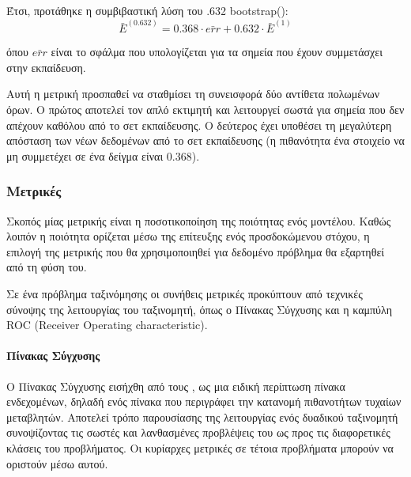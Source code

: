 Έτσι, προτάθηκε η συμβιβαστική λύση του .632 bootstrap():
\begin{equation}
\bar{E}^{(0.632)}= 0.368 \cdot \bar{err} + 0.632 \cdot \bar{E}^{(1)}
\end{equation}

όπου $\bar{err}$ είναι το σφάλμα που υπολογίζεται για τα σημεία που έχουν συμμετάσχει στην εκπαίδευση.

Αυτή η μετρική προσπαθεί να σταθμίσει τη συνεισφορά δύο αντίθετα πολωμένων όρων. Ο πρώτος αποτελεί τον απλό εκτιμητή και λειτουργεί σωστά για σημεία που δεν απέχουν καθόλου από το σετ εκπαίδευσης. Ο δεύτερος έχει υποθέσει τη μεγαλύτερη απόσταση των νέων δεδομένων από το σετ εκπαίδευσης (η πιθανότητα ένα στοιχείο να μη συμμετέχει σε ένα δείγμα είναι $0.368$).
\subsubsection{Μετρικές} Σκοπός μίας μετρικής είναι η ποσοτικοποίηση της ποιότητας ενός μοντέλου. Καθώς λοιπόν η ποιότητα ορίζεται μέσω της επίτευξης ενός προσδοκώμενου στόχου, η επιλογή της μετρικής που θα χρησιμοποιηθεί για δεδομένο πρόβλημα θα εξαρτηθεί από τη φύση του.

Σε ένα πρόβλημα ταξινόμησης οι συνήθεις μετρικές προκύπτουν από τεχνικές σύνοψης της λειτουργίας του ταξινομητή, όπως ο Πίνακας Σύγχυσης και η καμπύλη ROC (Receiver Operating characteristic).

\paragraph{Πίνακας Σύγχυσης} Ο Πίνακας Σύγχυσης εισήχθη από τους \citet{Provost98onapplied}, ως μια ειδική περίπτωση πίνακα ενδεχομένων, δηλαδή ενός πίνακα που περιγράφει την κατανομή πιθανοτήτων τυχαίων μεταβλητών. Αποτελεί τρόπο παρουσίασης της λειτουργίας ενός δυαδικού ταξινομητή συνοψίζοντας τις σωστές και λανθασμένες προβλέψεις του ως προς τις διαφορετικές κλάσεις του προβλήματος. Οι κυρίαρχες μετρικές σε τέτοια προβλήματα μπορούν να οριστούν μέσω αυτού.

